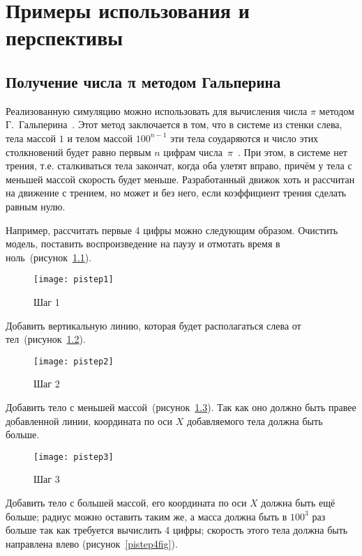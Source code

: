 \chapter{Примеры использования и перспективы}

\section{Получение числа π методом Гальперина}\label{pipool}

Реализованную симуляцию можно использовать для вычисления числа \(\pi\)
методом Г.~Гальперина~\cite{poolpi}.
Этот метод заключается в том, что в системе из стенки слева,
тела массой \(1\) и телом массой \(100^{n - 1}\) эти тела соударяются и число этих столкновений
будет равно первым \(n\) цифрам числа~\(\pi\)~\cite{habrpi}.
При этом, в системе нет трения, т.е. сталкиваться тела закончат, когда оба улетят вправо, причём у тела с меньшей массой скорость будет меньше.
Разработанный движок хоть и рассчитан на движение с трением, но может и без него, если коэффициент трения сделать равным нулю.

Например, рассчитать первые 4 цифры можно следующим образом.
Очистить модель, поставить воспроизведение на паузу и отмотать время в ноль~(рисунок~\ref{pistep1fig}).

\begin{figure}[H]
    \centering
    \texttt{[image: pistep1]}
    \caption{Шаг 1\label{pistep1fig}}
\end{figure}

Добавить вертикальную линию, которая будет располагаться слева от тел~(рисунок~\ref{pistep2fig}).

\begin{figure}[H]
    \centering
    \texttt{[image: pistep2]}
    \caption{Шаг 2\label{pistep2fig}}
\end{figure}

Добавить тело с меньшей массой~(рисунок~\ref{pistep3fig}).
Так как оно должно быть правее добавленной линии, координата по оси \(X\)
добавляемого тела должна быть больше.

\begin{figure}[H]
    \centering
    \texttt{[image: pistep3]}
    \caption{Шаг 3\label{pistep3fig}}
\end{figure}

Добавить тело с большей массой, его координата по оси \(X\) должна быть ещё больше;
радиус можно оставить таким же, а масса должна быть в \(100^3\) раз больше так как требуется вычислить 4 цифры;
скорость этого тела должна быть направлена влево (рисунок~\ref{pistep4fig}).

